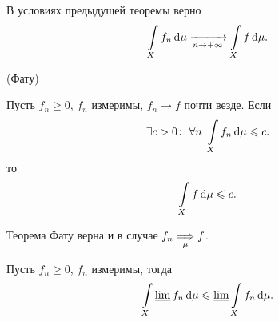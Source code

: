 \begin{corollary}
    
    В условиях предыдущей теоремы верно
\[
    \int\limits_{X}{f_n \,\mathrm{d}\mu} \xrightarrow[n \to +\infty]{} \int\limits_{X}{f \,\mathrm{d}\mu}
.\] 
\end{corollary}

\begin{theorem}(Фату)

    Пусть $f_n \geqslant 0$, $f_n$ измеримы, $f_n \to f$ почти везде. Если
\[
    \exists c > 0\colon~ \forall n~ \int\limits_{X}{f_n \,\mathrm{d}\mu} \leqslant c
.\] 
    то
\[
    \int\limits_{X}{f \,\mathrm{d}\mu} \leqslant c
.\] 
\end{theorem}

\begin{corollary}
    
    Теорема Фату верна и в случае $f_n \underset{\mu}{\Longrightarrow} f$.
\end{corollary}

\begin{corollary}
    
    Пусть $f_n \geqslant 0$, $f_n$ измеримы, тогда
\[
    \int\limits_{X}{\varliminf{f_n} \,\mathrm{d}\mu} \leqslant \varliminf{\int\limits_{X}{f_n \,\mathrm{d}\mu}}
.\] 
\end{corollary}
